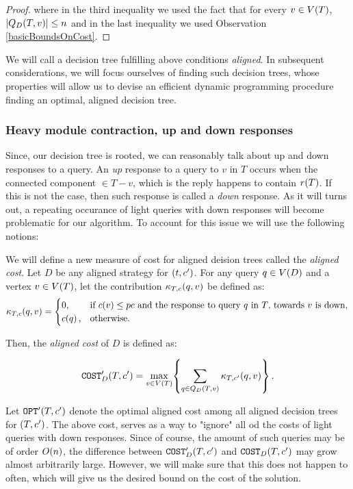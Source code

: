 \begin{lemma}
\begin{proof}
        where in the third inequality we used the fact that for every $v\in V\mathopen{}\left( T \right)$, $\mathopen{}\left| Q_{D}\mathopen{}\left( T,v \right) \right|\leq n$ and in the last inequality we used Observation \ref{basicBoundsOnCost}.
    \end{proof}
\end{lemma}

We will call a decision tree fulfilling above conditions \textit{aligned}. In subsequent considerations, we will focus ourselves of finding such decision trees, whose properties will allow us to devise an efficient dynamic programming procedure finding an optimal, aligned decision tree. 

\subsubsection{Heavy module contraction, up and down responses}
Since, our decision tree is rooted, we can reasonably talk about up and down responses to a query. An \textit{up} response to a query to $v$ in $T$ occurs when the connected component $\in T-v$, which is the reply happens to contain $r\mathopen{}\left( T \right)$. If this is not the case, then such response is called a \textit{down} response. As it will turns out, a repeating occurance of light queries with down responses will become problematic for our algorithm. To account for this issue we will use the following notions:

We will define a new measure of cost for aligned deision trees called the \textit{aligned cost}. Let $D$ be any aligned strategy for $\mathopen{}\left( t,c' \right)$. For any query $q\in V\mathopen{}\left( D \right)$ and a vertex $v\in V\mathopen{}\left( T \right)$, let the contribution $\kappa_{T,c}\mathopen{}\left( q,v \right)$ be defined as:
$$
\kappa_{T,c}\mathopen{}\left( q, v \right)= \begin{cases}
    0, & \text{if } c\mathopen{}\left( v \right)\leq pc \text{ and the response to query $q$ in $T$, towards $v$ is down},\\
    c\mathopen{}\left( q \right), & \text{otherwise}.
\end{cases}
$$

Then, the \textit{aligned cost} of $D$ is defined as:

$$
\texttt{COST}'_D\mathopen{}\left( T,c' \right)=\max_{v\in V\mathopen{}\left( T \right)}\mathopen{}\left\{ \sum_{q\in Q_D\mathopen{}\left( T,v \right)}\kappa_{T,c'}\mathopen{}\left( q,v \right) \right\}.
$$

Let $\texttt{OPT}'\mathopen{}\left( T,c' \right)$ denote the optimal aligned cost among all aligned decision trees for $\mathopen{}\left( T,c' \right)$.
The above cost, serves as a way to "ignore" all od the costs of light queries with down responses. Since of course, the amount of such queries may be of order $O\mathopen{}\left( n \right)$, the difference between $\texttt{COST}'_D\mathopen{}\left( T,c' \right)$ and $\texttt{COST}_D\mathopen{}\left( T,c' \right)$ may grow almost arbitrarily large. However, we will make sure that this does not happen to often, which will give us the desired bound on the cost of the solution.

